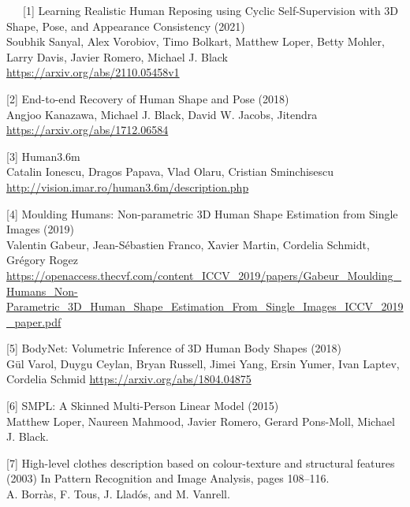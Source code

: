 
\medskip

~~~[1] Learning Realistic Human Reposing using Cyclic Self-Supervision with 3D Shape, Pose, and Appearance Consistency (2021)\\Soubhik Sanyal, Alex Vorobiov, Timo Bolkart, Matthew Loper, Betty Mohler, Larry Davis, Javier Romero, Michael J. Black
\url{https://arxiv.org/abs/2110.05458v1}

\medskip

[2] End-to-end Recovery of Human Shape and Pose (2018)\\Angjoo Kanazawa, Michael J. Black, David W. Jacobs, Jitendra
\url{https://arxiv.org/abs/1712.06584}

\medskip

[3] Human3.6m\\Catalin Ionescu, Dragos Papava, Vlad Olaru, Cristian Sminchisescu
\url{http://vision.imar.ro/human3.6m/description.php}

\medskip

[4] Moulding Humans: Non-parametric 3D Human Shape Estimation from Single Images (2019)\\
Valentin Gabeur, Jean-Sébastien Franco, Xavier Martin, Cordelia Schmidt, Grégory Rogez
\url{https://openaccess.thecvf.com/content_ICCV_2019/papers/Gabeur_Moulding_Humans_Non-Parametric_3D_Human_Shape_Estimation_From_Single_Images_ICCV_2019_paper.pdf}

\medskip

[5] BodyNet: Volumetric Inference of 3D Human Body Shapes (2018)\\
Gül Varol, Duygu Ceylan, Bryan Russell, Jimei Yang, Ersin Yumer, Ivan Laptev, Cordelia Schmid
\url{https://arxiv.org/abs/1804.04875}

\medskip

[6] SMPL: A Skinned Multi-Person Linear Model (2015)\\
Matthew Loper, Naureen Mahmood, Javier Romero, Gerard Pons-Moll, Michael J. Black.

\medskip

[7] High-level clothes description based on colour-texture and structural features (2003)
In Pattern Recognition and Image Analysis, pages 108–116.\\
A. Borràs, F. Tous, J. Lladós, and M. Vanrell.

\medskip

